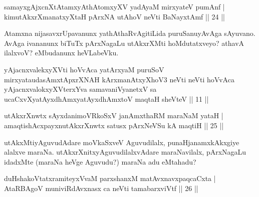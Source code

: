
\begin{shl}
samayxgAjxcnXtAtamxyAthAtomxyXV yadA\s yaM mirxyateV pumAnf |\\
kimutAkxrXmanatxyXtaH pArxNA utAhoV neVti BaNayxtAmf \hfill || 24 ||
\end{shl}

\begin{artha}
Atamxna nijasavxrUpavanunx yathAthaRvAgitiLida puruSanu\break yAvAga sAyuvano. AvAga ivananunx 
biTuTx pArxNagaLu utAkxrXMti hoMdutatxveyo? athavA ilalxvoV? eMbudanunx heVLabeVku.
\end{artha}


\begin{kandikeshl}
yAjacnxvalekxyXVti hoVvAca yatArxyaM puruSoV mirxyata\break udasAmxtApxrXNAH kArxmanAtxyXhoV3 neVti neVti hoVvAca yAjacnx\-\break valokxyXV\s terxYva samavaniVyanetxV sa ucaCxvXyatAyxdhAmxyatAyxdhAmxtoV maqtaH sheVteV || 11 ||
\end{kandikeshl}




\begin{shl}
utAkxrXnwtx sAyxdanimoVRkoSxV janAmxthaRM maraNaM yataH |\\
amaqtishAcxpayxnutAkxrXnwtx satusx pArxNeVSu kA maqtiH \hfill || 25 ||
\end{shl}

\begin{artha}
utAkxMtiyAguvudAdare moVkaSxveV Aguvudilalx, punaH\break janamxkAkxgiye alalxve maraNa. 
utAkxrXnitxyAguvudilalxvAdare maraNavilalx, pArxNagaLu idadxMte (maraNa heVge Aguvudu?) 
maraNa adu eMtahadu?
\end{artha}

\begin{shl}
duHshakoVtatxramiteyxVvaM parxshanxM matAvx\s navxpaqcaCxta |\\
AtaRBAgoV muniviRdAvxnasx ca neVti tamabarxviVtf \hfill || 26 ||
\end{shl}

